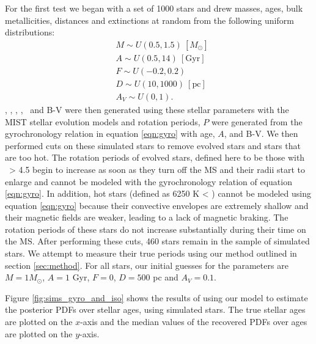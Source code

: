 For the first test we began with a set of 1000 stars and drew masses, ages,
bulk metallicities, distances and extinctions at random from the following
uniform distributions:
\begin{eqnarray}
& M \sim U(0.5, 1.5)~[M_\odot] \\
& A \sim U(0.5, 14)\mathrm{~[Gyr]} \\
& F \sim U(-0.2, 0.2) \\
& D \sim U(10, 1000)~\mathrm{[pc]} \\
& A_V \sim U(0, 1).
\end{eqnarray}
\teff, \logg, \fhat, {\bf \mx}, \pmega\ and B-V were then generated using
these stellar parameters with the MIST stellar evolution models \citep{choi}
and rotation periods, $P$ were generated from the gyrochronology relation in
equation \ref{eqn:gyro} with age, $A$, and B-V.
We then performed cuts on these simulated stars to remove evolved stars and
stars that are too hot.
The rotation periods of evolved stars, defined here to be those with \logg\ >
4.5 begin to increase as soon as they turn off the MS and their radii start to
enlarge and cannot be modeled with the gyrochronology relation of equation
\ref{eqn:gyro}.
In addition, hot stars (defined as 6250 K < \teff) cannot be modeled using
equation \ref{eqn:gyro} because their convective envelopes are extremely
shallow and their magnetic fields are weaker, leading to a lack of magnetic
braking.
The rotation periods of these stars do not increase substantially during their
time on the MS.
After performing these cuts, 460  stars remain in the sample
of simulated stars.
We attempt to measure their true periods using our method outlined in section
\ref{sec:method}.
For all stars, our initial guesses for the parameters are $M = 1M_\odot$, $A =
1$ Gyr, $F = 0$, $D = 500$ pc and $A_V = 0.1$.

Figure \ref{fig:sims_gyro_and_iso} shows the results of using our model to
estimate the posterior PDFs over stellar ages, using simulated stars.
The true stellar ages are plotted on the $x$-axis and the median values of the
recovered PDFs over ages are plotted on the $y$-axis.


